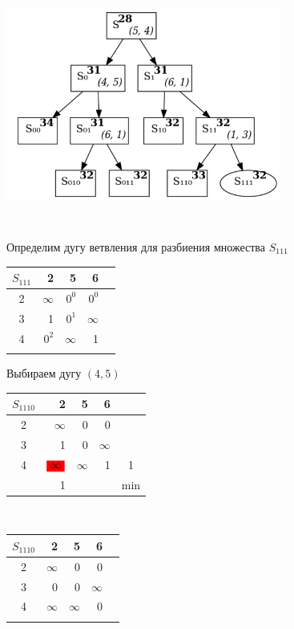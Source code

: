 \documentclass[12pt]{article}
\begin{document}
\begin{flushleft}
 
\includegraphics[width = 9cm, height = 8cm]{pictures/picture_10.jpg}\\
\end{flushleft}
\vspace{3cm}
\begin{flushleft}
 
Определим дугу ветвления для разбиения множества $S_{111}$\\
\end{flushleft}

\begin{flushleft}
\begin{tabular}{c||rrr||c}
 $S_{111}$ & 2  & 5 & 6 & \\
\hline
\hline
2 &  $\infty$   & $0^0$ & $0^0$ & \\
3 &  1   & $0^1$ & $\infty$ & \\
4 &  $0^2$   & $\infty$ & 1 & \\
\hline
\hline
 &  &  &  & \\
\end{tabular}
\end{flushleft}

Выбираем дугу $(4,5)$

\begin{flushleft}
\begin{tabular}{c||rrr||c}
 $S_{1110}$ & 2  & 5 & 6 & \\
\hline
\hline
2 &  $\infty$ &0& 0 & \\
3 &  1   & 0 & $\infty$ & \\
4 &  $\colorbox{red}{$\infty$}$   & $\infty$ & 1 & 1\\
\hline
\hline
 & 1 &  &  & min \\
\end{tabular}
$\qquad $ 
\begin{tabular}{c||rrr||c}
 $S_{1110}$ & 2  & 5 & 6 & \\
\hline
\hline
2 &  $\infty$ &0& 0 & \\
3 &  0   & 0 & $\infty$ & \\
4 &  $\infty$  & $\infty$ & 0 & \\
\hline
\hline
 & &  &  & \\
\end{tabular}
\end{flushleft}
\end{document}
